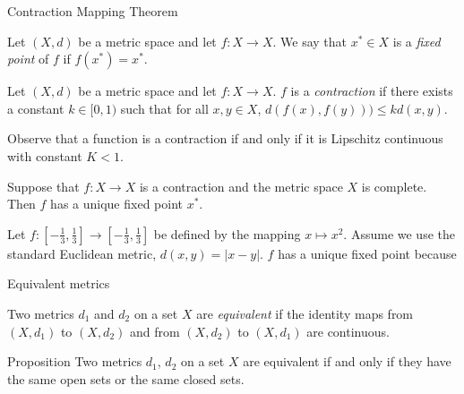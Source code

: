 \documentclass [aspectratio=169]{beamer}
\begin{document}
\begin{frame}{Contraction Mapping Theorem}
\begin{definition}
Let $(X,d)$ be a metric space and let $f:X \to X$. We say that $x^* \in X$ is a \emph{fixed point} of $f$ if $f(x^*) = x^*$.
\end{definition}

\begin{definition}
Let $(X,d)$ be a metric space and let $f:X \to X$. $f$ is a \emph{contraction} if there exists a constant $k \in [0,1)$ such that for all $x,y \in X$, $d(f(x),f(y))) \leq k d(x,y)$.
\end{definition}

Observe that a function is a contraction if and only if it is Lipschitz continuous with constant $K < 1$.



\begin{theorem}
Suppose that $f : X \to X$ is a contraction and the metric space $X$ is complete. Then $f$ has a unique fixed point $x^*$.
\end{theorem}
\end{frame}

\begin{frame}

\begin{example}
Let $f:\left[-\frac{1}{3},\frac{1}{3}\right] \to \left[-\frac{1}{3},\frac{1}{3}\right]$ be defined by the mapping $x \mapsto x^2$. Assume we use the standard Euclidean metric, $d(x,y) = |x-y|$. $f$ has a unique fixed point because

\vspace{3cm}
\end{example}

\end{frame}


\begin{frame}{Equivalent metrics}
\begin{definition}
Two metrics $d_1$ and $d_2$ on a set $X$ are \emph{equivalent} if the identity maps from $(X,d_1)$ to $(X,d_2)$ and from $(X,d_2)$ to $(X,d_1)$ are continuous. 
\end{definition}

\vspace{1em}

\begin{exampleblock}{Proposition}
Two metrics $d_1$, $d_2$ on a set $X$ are equivalent if and only if they have the same open sets or the same closed sets.
\end{exampleblock}
\end{frame}
\end{document}
